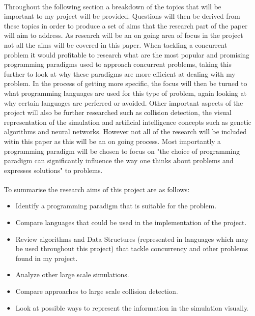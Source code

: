 \documentclass{report}
\begin{document}
\paragraph{}Throughout the following section a breakdown of the topics that will be important to my project will be provided. Questions will then be derived from these topics in order to produce a set of aims that the research part of the paper will aim to address. As research will be an on going area of focus in the project not all the aims will be covered in this paper. When tackling a concurrent problem it would profitable to research what are the most popular and promising programming paradigms used to approach concurrent problems, taking this further to look at why these paradigms are more efficient at dealing with my problem. In the process of getting more specific, the focus will then be turned to what programming languages are used for this type of problem, again looking at why certain languages are perferred or avoided. Other important aspects of the project will also be further researched such as collision detection, the visual representation of the simulation and artificial intelligence concepts such as genetic algorithms and neural networks. However not all of the research will be included witin this paper as this will be an on going process. Most importantly a programming paradigm will be chosen to focus on "the choice of programming paradigm can significantly influence the way one thinks about problems and expresses solutions" to problems. \cite{Curriculum2008}

\paragraph{}To summarise the research aims of this project are as follows:

\begin{itemize}
	\item Identify a programming paradigm that is suitable for the problem.
	\item Compare languages that could be used in the implementation of the project.
	\item Review algorithms and Data Structures (represented in languages which may be used throughout this project) that tackle concurrency and other problems found in my project.
	\item Analyze other large scale simulations.
	\item Compare approaches to large scale collision detection.
	\item Look at possible ways to represent the information in the simulation visually.
\end{itemize}
\end{document}
